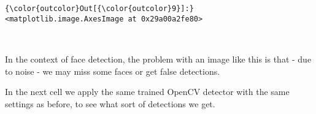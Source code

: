 \documentclass[11pt]{article}
\begin{document}
\begin{Verbatim}[commandchars=\\\{\}]
{\color{outcolor}Out[{\color{outcolor}9}]:} <matplotlib.image.AxesImage at 0x29a00a2fe80>
\end{Verbatim}
            
    \begin{center}
    \end{center}
    { \hspace*{\fill} \\}
    
    In the context of face detection, the problem with an image like this is
that - due to noise - we may miss some faces or get false detections.

In the next cell we apply the same trained OpenCV detector with the same
settings as before, to see what sort of detections we get.
\end{document}
